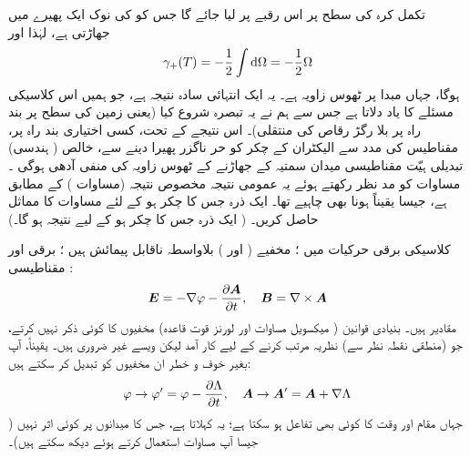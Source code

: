 تکمل کرہ کی سطح پر اس رقبے پر لیا جائے گا جس کو  کی  نوک  ایک پھیرے  میں  جھاڑتی  ہے،   لہٰذا   اور 
\begin{align}\label{مساوات_حر_عمومی_نتیجہ}
\gamma_{+} (T) = - \frac{1}{2} \int \dif \Omega = - \frac{1}{2} \Omega
\end{align}
ہوگا، جہاں مبدا  پر ٹھوس زاویہ  ہے۔  یہ ایک انتہائی سادہ نتیجہ ہے،  جو ہمیں اس کلاسیکی مسئلے  کا یاد دلاتا ہے جس سے ہم نے یہ تبصرہ شروع کیا  (یعنی زمین کی سطح پر  بند راہ پر   بلا رگڑ   رقاص   کی منتقلی)۔  اس نتیجے کے تحت،  کسی اختیاری بند راہ پر،   مقناطیس کی مدد سے الیکٹران کے چکر کو حر ناگزر  پھیرا دینے سے،  خالص ( ہندسی) تبدیلی ہیّت مقناطیسی میدان سمتیہ کے جھاڑنے کے  ٹھوس زاویہ کی منفی آدھی   ہوگی ۔  مساوات    کو مد نظر رکھتے ہوئے یہ عمومی نتیجہ   مخصوص نتیجہ   (مساوات )   کے مطابق ہے،  جیسا یقیناً ہونا بھی چاہیے  تھا۔
ایک ذرہ جس کا چکر    ہو کے لئے مساوات    کا مماثل حاصل کریں۔    ( ایک ذرہ جس کا چکر  ہو کے لیے نتیجہ   ہو گا۔)




کلاسیکی برقی حرکیات میں ؛ مخفیے  (  اور )  بلاواسطہ ناقابل پیمائش ہیں ؛   برقی اور مقناطیسی  : 
\begin{align}\label{مساوات_حر_طبیعی_میدان}
{\ensuremath{{\boldsymbol{E}}}} = - \nabla \varphi - \frac{\partial {\ensuremath{{\boldsymbol{A}}}}}{\partial t}, \quad {\ensuremath{{\boldsymbol{B}}}} = \nabla \times {\ensuremath{{\boldsymbol{A}}}}
\end{align}
  مقادیر ہیں۔   بنیادی قوانین ( میکسویل مساوات اور لورنز  قوت  قاعدہ) مخفیوں  کا کوئی ذکر نہیں کرتے،  جو  (منطقی نقطہ نظر سے)  نظریہ  مرتب کرنے  کے لیے کار آمد لیکن ویسے غیر ضروری ہیں۔  یقیناً، آپ  بغیر  خوف  و خطر ان مخفیوں  کو تبدیل کر سکتے ہیں: 
\begin{align}
\varphi \to \varphi' = \varphi - \frac{\partial \Lambda}{\partial t}, \quad {\ensuremath{{\boldsymbol{A}}}} \to {\ensuremath{{\boldsymbol{A}}}}' = {{\boldsymbol{A}}} + \nabla \Lambda
\end{align}
جہاں  مقام اور وقت کا کوئی بھی تفاعل ہو سکتا ہے؛  یہ    کہلاتا  ہے،   جس کا میدانوں پر کوئی اثر نہیں    ( جیسا آپ مساوات    استعمال کرتے ہوئے   دیکھ سکتے ہیں)۔ 

